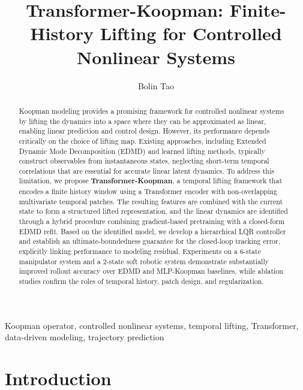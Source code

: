 \documentclass[journal]{IEEEtran}
\begin{document}
\title{Transformer-Koopman: Finite-History Lifting for Controlled Nonlinear Systems}

\author{Bolin Tao}


\maketitle

\begin{abstract}
Koopman modeling provides a promising framework for controlled nonlinear systems by lifting the dynamics into a space where they can be approximated as linear, enabling linear prediction and control design. However, its performance depends critically on the choice of lifting map. Existing approaches, including Extended Dynamic Mode Decomposition (EDMD) and learned lifting methods, typically construct observables from instantaneous states, neglecting short-term temporal correlations that are essential for accurate linear latent dynamics.
To address this limitation, we propose \textbf{Transformer-Koopman}, a temporal lifting framework that encodes a finite history window using a Transformer encoder with non-overlapping multivariate temporal patches. The resulting features are combined with the current state to form a structured lifted representation, and the linear dynamics are identified through a hybrid procedure combining gradient-based pretraining with a closed-form EDMD refit.
Based on the identified model, we develop a hierarchical LQR controller and establish an ultimate-boundedness guarantee for the closed-loop tracking error, explicitly linking performance to modeling residual. Experiments on a 6-state manipulator system and a 2-state soft robotic system demonstrate substantially improved rollout accuracy over EDMD and MLP-Koopman baselines, while ablation studies confirm the roles of temporal history, patch design, and regularization.
\end{abstract}

\begin{IEEEkeywords}
Koopman operator, controlled nonlinear systems, temporal lifting, Transformer, data-driven modeling, trajectory prediction
\end{IEEEkeywords}

\section{Introduction}
\label{sec:introduction}
\end{document}

